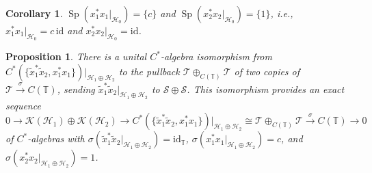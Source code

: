 \documentclass[11pt]{article}
\numberwithin{equation}{section}
\newtheorem{proposition}{Proposition}
\newtheorem{corollary}{Corollary}
\begin{document}
\begin{corollary}\label{H0spectrum} $\operatorname{Sp}( x_{1}^{\ast}x_{1}%
|_{\mathcal{H}_{0}}) =\{c\} $ and $\operatorname{Sp}
( x_{2}^{\ast}x_{2}|_{\mathcal{H}_{0}}) =\{1\} $,
i.e., $x_{1}^{\ast}x_{1}|_{\mathcal{H}_{0}}=c\, \mathrm{id}$ and $x_{2}^{\ast
}x_{2}|_{\mathcal{H}_{0}}=\mathrm{id}$.
\end{corollary}

\begin{proposition}\label{iso} There is a unital $C^*$-algebra isomorphism from
$C^{\ast}( \{ \tilde{x}_{1}^{\ast}\tilde{x}_{2},x_{1}^{\ast}%
x_{1} \} ) |_{\mathcal{H}_{1}\oplus\mathcal{H}_{2}}$ to the
pullback $\mathcal{T}\oplus_{C(\mathbb{T}) }\mathcal{T}$ of two
copies of $\mathcal{T}\overset{\sigma}{\rightarrow}C(\mathbb{T})
$, sending $\tilde{x}_{1}^{\ast}\tilde{x}_{2}|_{\mathcal{H}_{1}\oplus
\mathcal{H}_{2}}$ to $\mathcal{S}\oplus\mathcal{S}$. This isomorphism provides
an exact sequence%
\[
0\rightarrow\mathcal{K}( \mathcal{H}_{1}) \oplus\mathcal{K}%
( \mathcal{H}_{2}) \rightarrow C^{\ast}(\{ \tilde
{x}_{1}^{\ast}\tilde{x}_{2},x_{1}^{\ast}x_{1}\} ) |_{\mathcal{H}%
_{1}\oplus\mathcal{H}_{2}}\cong\mathcal{T}\oplus_{C(\mathbb{T})
}\mathcal{T}\overset{\sigma}{\rightarrow}C(\mathbb{T})
\rightarrow0
\]
of $C^*$-algebras with $\sigma( \tilde{x}_{1}^{\ast}\tilde{x}%
_{2}|_{\mathcal{H}_{1}\oplus\mathcal{H}_{2}}) =\mathrm{id}_{\mathbb{T}%
}$, $\sigma( x_{1}^{\ast}x_{1}|_{\mathcal{H}_{1}\oplus\mathcal{H}_{2}%
}) =c$, and $\sigma( x_{2}^{\ast}x_{2}|_{\mathcal{H}_{1}%
\oplus\mathcal{H}_{2}}) =1$.
\end{proposition}
\end{document}
